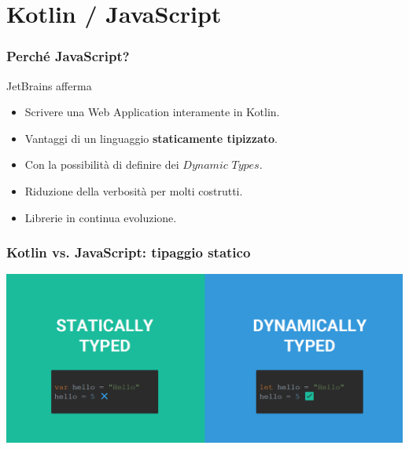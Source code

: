     \section{Kotlin / JavaScript}
    \begin{frame}
      \frametitle{Perché JavaScript?}
      \begin{block}{JetBrains afferma}
        \begin{itemize}[<+->]
          \item Scrivere una Web Application interamente in Kotlin.
          \bigskip
          \item Vantaggi di un linguaggio \textbf{staticamente tipizzato}.
          \bigskip
          \item Con la possibilità di definire dei $Dynamic$ $Types$.
          \bigskip
          \item Riduzione della verbosità per molti costrutti.
          \bigskip
          \item Librerie in continua evoluzione.
          \bigskip
        \end{itemize}
      \end{block}
    \end{frame}

    \begin{frame}
      \frametitle{Kotlin vs. JavaScript: tipaggio statico}
      \begin{center}
        \includegraphics[scale=0.35]{StatVSDinPNG}
      \end{center}
    \end{frame}

